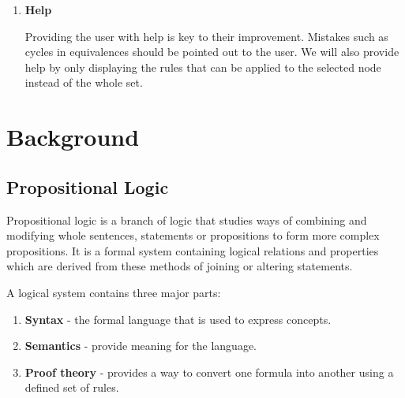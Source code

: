 \documentclass[draft]{report}
\begin{document}
\begin{enumerate}
\item \textbf{Help}

Providing the user with help is key to their improvement. Mistakes such as cycles in equivalences should be pointed out to the user. We will also provide help by only displaying the rules that can be applied to the selected node instead of the whole set.


\end{enumerate}

\chapter{Background} 

\section{Propositional Logic}

Propositional logic is a branch of logic that studies ways of combining and modifying whole sentences, statements or propositions to form more complex propositions. It is a formal system containing logical relations and properties which are derived from these methods of joining or altering statements.

A logical system contains three major parts:

\begin{enumerate}
\item \textbf{Syntax} - the formal language that is used to express concepts.
\item \textbf{Semantics} - provide meaning for the language.
\item \textbf{Proof theory} - provides a way to convert one formula into another using a defined set of rules.
\end{enumerate}
\end{document}
